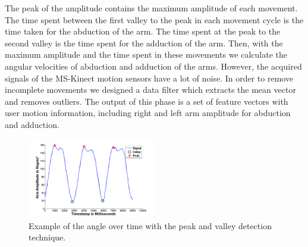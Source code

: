 \documentclass[10pt, conference, compsocconf]{IEEEtran}
\begin{document}

The peak of the amplitude contains the maximum amplitude of each movement. The time spent between the first valley to the peak in each movement cycle is the time taken for the abduction of the arm. The time spent at the peak to the second valley is the time spent for the adduction of the arm. Then, with the maximum amplitude and the time spent in these movements we calculate the angular velocities of abduction and adduction of the arms. However, the acquired signals of the MS-Kinect motion sensors have a lot of noise. In order to remove incomplete movements we designed a data filter which extracts the mean vector and removes outliers. The output of this phase is a set of feature vectors with user motion information, including right and left arm amplitude for abduction and adduction.




\begin{figure}[!htb]
	\centering
	\includegraphics[width=0.5\textwidth]{img/signalamplitudepeakvaley-2.png}
	\caption{Example of the angle over time with the peak and valley detection technique.}
	\label{fig:signalamplitudepeakvaley}
\end{figure}
\end{document}
